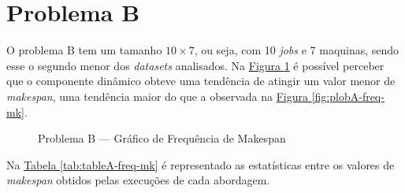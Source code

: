 \section{Problema B}
O problema B tem um tamanho $10 \times 7$, ou seja, com 10 \textit{jobs} e 7 maquinas, 
sendo esse o segundo menor dos \textit{datasets} analisados.
Na \hyperref[fig:plobB-freq-mk]{Figura \ref{fig:plobB-freq-mk}} 
é possível perceber que o componente dinâmico obteve uma 
tendência de atingir um valor menor de \textit{makespan}, 
uma tendência maior do que a observada 
na \hyperref[fig:plobA-freq-mk]{Figura \ref{fig:plobA-freq-mk}}.
\begin{figure}[!htb]
    \caption{Problema B — Gráfico de Frequência de Makespan}
    \label{fig:plobB-freq-mk}
    \begin{minipage}{.5\linewidth}
        \centering
        \subfloat[]{
            \label{plobB-freq-mk:a}
            \resizebox{\linewidth}{!}{}
        }
    \end{minipage}%
    \begin{minipage}{.5\linewidth}
        \centering
        \subfloat[]{
            \label{plobB-freq-mk:b}
            \resizebox{\linewidth}{!}{}
        }
    \end{minipage}\par\medskip
      \centering
      \subfloat[]{
        \label{plobB-freq-mk:c}
        \resizebox{.5\linewidth}{!}{}
      }
\end{figure}
Na
\hyperref[tab:tableA-freq-mk]{Tabela \ref{tab:tableA-freq-mk}}
é representado as estatísticas entre os valores de \textit{makespan} obtidos pelas execuções de cada abordagem.
